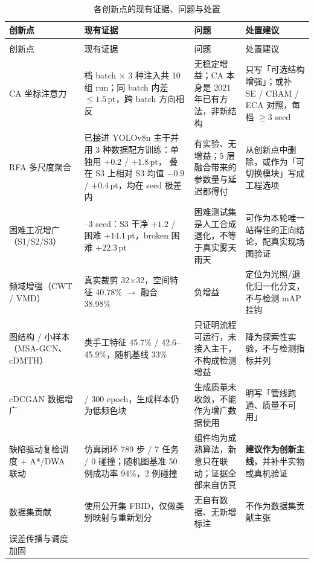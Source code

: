 \documentclass[UTF8,a4paper,11pt]{ctexart}
\begin{document}
\begin{scriptsize}
\begin{longtable}{@{}>{\raggedright\arraybackslash}p{2.15cm}
                     >{\raggedright\arraybackslash}p{3.95cm}
                     >{\raggedright\arraybackslash}p{4.05cm}
                     >{\raggedright\arraybackslash}p{3.45cm}@{}}
\caption{各创新点的现有证据、问题与处置}\label{tab:novelty}\\
\toprule
创新点 & 现有证据 & 问题 & 处置建议 \\
\midrule
\endfirsthead
\multicolumn{4}{@{}l}{\footnotesize 表~\thetable（续）}\\[2pt]
\toprule
创新点 & 现有证据 & 问题 & 处置建议 \\
\midrule
\endhead
\bottomrule
\endfoot
CA 坐标注意力
  & 3 档 batch × 3 种注入共 10 组 run；同 batch 内差 $\le 1.5$\,pt，跨 batch 方向相反
  & 无稳定增益；CA 本身是 2021 年已有方法，非新结构
  & 只写「可选结构增强」；或补 SE / CBAM / ECA 对照，每档 $\ge 3$ seed \\
RFA 多尺度聚合
  & 已接进 YOLOv8n 主干并用 3 种数据配方训练：单独用 $+0.2$ / $+1.8$\,pt，
    叠在 S3 上相对 S3 均值 $-0.9$ / $+0.4$\,pt，均在 seed 极差内
  & 有实验、无增益；5 层融合带来的参数量与延迟都得付
  & 从创新点中删除，或作为「可切换模块」写成工程选项 \\
困难工况增广（S1/S2/S3）
  & 2--3 seed：S3 干净 $+1.2$ / 困难 $+14.1$\,pt，broken 困难 $+22.3$\,pt
  & 困难测试集是人工合成退化，不等于真实雾天雨天
  & 可作为本轮唯一站得住的正向结论，配真实现场图验证 \\
频域增强（CWT / VMD）
  & 真实裁剪 32$\times$32，空间特征 40.78\% $\rightarrow$ 融合 38.98\%
  & 负增益
  & 定位为光照/退化归一化分支，不与检测 mAP 挂钩 \\
图结构 / 小样本（MSA-GCN、cDMTH）
  & 3 类手工特征 45.7\% / 42.6--45.9\%，随机基线 33\%
  & 只证明流程可运行，未接入主干，不构成检测增益
  & 降为探索性实验，不与检测指标并列 \\
cDCGAN 数据增广
  & 60 / 300 epoch，生成样本仍为低频色块
  & 生成质量未收敛，不能作为增广数据使用
  & 明写「管线跑通、质量不可用」 \\
缺陷驱动复检调度 + A*/DWA 联动
  & 仿真闭环 789 步 / 7 任务 / 0 碰撞；随机图基准 50 例成功率 94\%，2 例碰撞
  & 组件均为成熟算法，新意只在联动；证据全部来自仿真
  & \textbf{建议作为创新主线}，并补半实物或真机验证 \\
数据集贡献
  & 使用公开集 FBID，仅做类别映射与重新划分
  & 无自有数据、无新增标注
  & 不作为数据集贡献主张 \\
误差传播与调度加固

\end{longtable}
\end{scriptsize}
\end{document}
